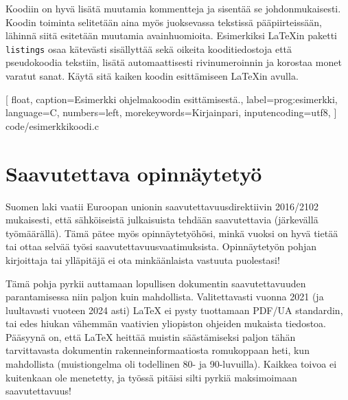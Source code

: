 Koodiin on hyvä lisätä muutamia kommentteja ja sisentää se johdonmukaisesti. Koodin toiminta selitetään aina myös juoksevassa tekstissä pääpiirteissään, lähinnä siitä esitetään muutamia avainhuomioita. Esimerkiksi \LaTeX{}in paketti \texttt{listings} \parencite{listings,notsoshort} osaa kätevästi sisällyttää sekä oikeita kooditiedostoja että pseudokoodia tekstiin, lisätä automaattisesti rivinumeroinnin ja korostaa monet varatut sanat. Käytä sitä kaiken koodin esittämiseen \LaTeX{}in avulla.

\renewcommand{\lstlistingname}{Ohjelma}

    [
        float,
        caption={Esimerkki ohjelmakoodin esittämisestä.},
        label=prog:esimerkki,
        language=C,
        numbers=left,
        morekeywords={Kirjainpari},
        inputencoding=utf8,
    ]
    {code/esimerkkikoodi.c}

\section{Saavutettava opinnäytetyö}

Suomen laki vaatii Euroopan unionin saavutettavuusdirektiivin 2016/2102 mukaisesti, että sähköiseistä julkaisuista tehdään saavutettavia (järkevällä työmäärällä). Tämä pätee myös opinnäytetyöhösi, minkä vuoksi on hyvä tietää tai ottaa selvää työsi saavutettavuusvaatimuksista. Opinnäytetyön pohjan kirjoittaja tai ylläpitäjä ei ota minkäänlaista vastuuta puolestasi!

Tämä pohja pyrkii auttamaan lopullisen dokumentin saavutettavuuden parantamisessa niin paljon kuin mahdollista. Valitettavasti vuonna 2021 (ja luultavasti vuoteen 2024 asti) \LaTeX{} ei pysty tuottamaan PDF/UA standardin, tai edes hiukan vähemmän vaativien yliopiston ohjeiden mukaista tiedostoa. Pääsyynä on, että \LaTeX{} heittää muistin säästämiseksi paljon tähän tarvittavasta dokumentin rakenneinformaatiosta romukoppaan heti, kun mahdollista (muistiongelma oli todellinen 80- ja 90-luvuilla). Kaikkea toivoa ei kuitenkaan ole menetetty, ja työssä pitäisi silti pyrkiä maksimoimaan saavutettavuus!

